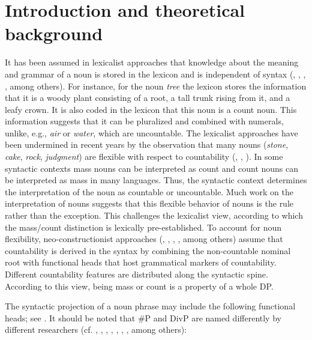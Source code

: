 \documentclass[output=paper,colorlinks,citecolor=brown]{langscibook}
\begin{document}

\section{Introduction and theoretical background}

It has been assumed in lexicalist approaches that knowledge about the meaning and grammar of a noun is stored in the lexicon and is independent of syntax (\citealt{DiSciulloWilliams1987}, \citealt{Zimmermann1983}, \citealt{gb:Zimmermann1988}, \citealt{Wasow1977}, among others). For instance, for the noun \textit{tree} the lexicon stores the information that it is a woody plant consisting of a root, a tall trunk rising from it, and a leafy crown. It is also coded in the lexicon that this noun is a count noun. This information suggests that it can be pluralized and combined with numerals, unlike, e.g., \textit{air} or \textit{water}, which are uncountable. The lexicalist approaches have been undermined in recent years by the observation that many nouns (\textit{stone}, \textit{cake}, \textit{rock}, \textit{judgment}) are flexible with respect to countability (\citealt{Rothstein2010}, \citealt{KissPelletier2014}, \citealt{Zamparelli2017}). In some syntactic contexts mass nouns can be interpreted as count and count nouns can be interpreted as mass in many languages. Thus, the syntactic context determines the interpretation of the noun as countable or uncountable. Much work on the interpretation of nouns suggests that this flexible behavior of nouns is the rule rather than the exception. This challenges the lexicalist view, according to which the mass/count distinction is lexically pre-established. To account for noun flexibility, neo-constructionist approaches (\citealt{Marantz1997}, \citealt{Borer2003}, \citealt{Borer2005}, \citealt{Kratzer2007}, among others) assume that countability is derived in the syntax by combining the non-countable nominal root with functional heads that host grammatical markers of countability. Different countability features are distributed along the syntactic spine. According to this view, being mass or count is a property of a whole DP. 

The syntactic projection of a noun phrase may include the following functional heads; see . It should be noted that \#P and DivP are named differently by different researchers (cf. \citealt{AlexiadouStavrou2007}, \citealt{Borer2005}, \citealt{ChengSybesma1999,ChengSybesma2014}, \citealt{ChengZamparelli2017}, \citealt{Mathieu2012}, \citealt{Wiltschko2008}, \citealt{Zamparelli2000}, among others):
\end{document}

